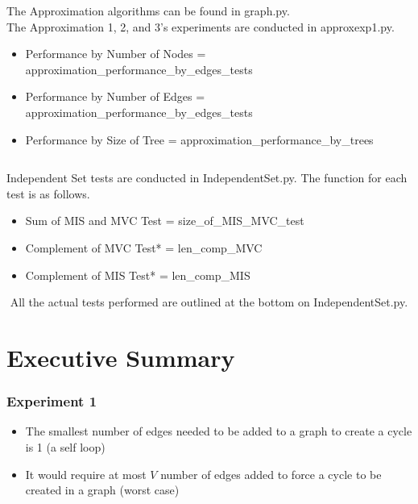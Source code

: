 \documentclass[12pt]{article}
\begin{document}

The Approximation algorithms can be found in graph.py. \\
The Approximation 1, 2, and 3's experiments are conducted in approxexp1.py.
\\
\begin{itemize}
    \item Performance by Number of Nodes = approximation\_performance\_by\_edges\_tests\(\)
    \item Performance by Number of Edges = approximation\_performance\_by\_edges\_tests\(\)
    \item Performance by Size of Tree = approximation\_performance\_by\_trees\(\)
\end{itemize}


\newline
$ $
\newline

Independent Set tests are conducted in IndependentSet.py.
The function for each test is as follows.
\begin{itemize}
    \item Sum of MIS and MVC Test = size\_of\_MIS\_MVC\_test\(\)
    \item Complement of MVC Test* = len\_comp\_MVC\(\)
    \item Complement of MIS Test* = len\_comp\_MIS\(\)
\end{itemize}
$ $
\newline
All the actual tests performed are outlined at the bottom on IndependentSet.py.



\newpage
\section{Executive Summary}

\subsubsection{Experiment 1}
\begin{itemize}
    \item The smallest number of edges needed to be added to a graph to create a cycle is 1 (a self loop)
    \item It would require at most $V$ number of edges added to force a cycle to be created in a graph (worst case) 
  \end{itemize}
\end{document}
